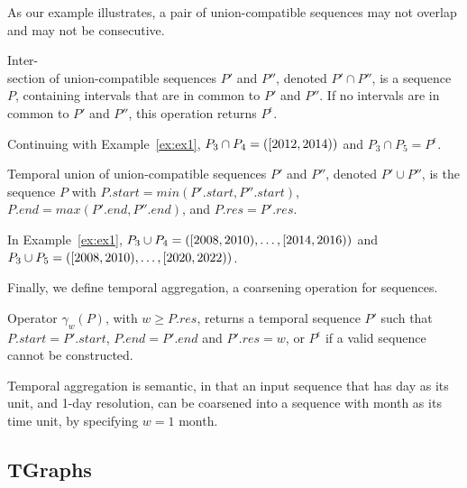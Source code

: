 As our example illustrates, a pair of union-compatible sequences may
not overlap and may not be consecutive.

\begin{definition}  
Inter-\\section of union-compatible sequences $P'$ and $P''$, denoted $P'
\cap P''$, is a sequence $P$, containing intervals that are in common
to $P'$ and $P''$.  If no intervals are in common to $P'$ and $P''$,
this operation returns $P^{\epsilon}$.
\label{def:tseqand}
\end{definition}
\vspace{-0.1cm}

Continuing with Example~\ref{ex:ex1}, $P_3 \cap P_4 =
([2012,2014))$ and $P_3 \cap P_5 = P^{\epsilon}$.

\begin{definition} 
Temporal union of union-compatible sequences $P'$ and $P''$, denoted
$P' \cup P''$, is the sequence $P$ with $P.start = min(P'.start,
P''.start)$, $P.end = max(P'.end, P''.end)$, and $P.res = P'.res$.
\label{def:tseqor}
\end{definition}
\vspace{-0.1cm}

In Example~\ref{ex:ex1}, $P_3 \cup P_4 =
([2008,2010),\ldots,[2014,2016))$ and $P_3
    \cup P_5 = ([2008,2010), \ldots,
      [2020,2022))$.

Finally, we define temporal aggregation, a coarsening operation for sequences.

\begin{definition}  Operator $\gamma_w(P)$, 
with $w \geq P.res$, returns a temporal sequence $P'$ such that
$P.start = P'.start$, $P.end = P'.end$ and $P'.res = w$, or
$P^{\epsilon}$ if a valid sequence cannot be constructed.
\label{def:tgroup}
\end{definition}

Temporal aggregation is semantic, in that an input sequence that has
day as its unit, and 1-day resolution, can be coarsened into a
sequence with month as its time unit, by specifying $w = 1$ month.

\subsection{TGraphs}
\label{sec:model:tg}

